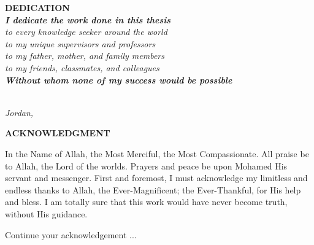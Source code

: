 \documentclass[
11pt, %
oneside, %
english, %
onehalfspacing, %
liststotoc, %
toctotoc, %
parskip, %
]{MastersDoctoralThesis} %
\begin{document}
\cleardoublepage
\frontmatter
{} %
\cleardoublepage{}
\begin{center}
{\Large \bfseries DEDICATION}\\[3cm]
\Large{\textit{\textbf{I dedicate the work done in this thesis}}}\\[2cm]
\Large{\textit{to every knowledge seeker around the world}}\\[1cm]
\Large{\textit{to my unique supervisors and professors}}\\[1cm]
\Large{\textit{to my father, mother, and family members}}\\[1cm]
\Large{\textit{to my friends, classmates, and colleagues}}\\[2cm]
\Large{\textit{\textbf{Without whom none of my success would be possible}}}\\[5cm]
\begin{flushright}
\textit{\authorname}\\
\textit{Jordan, \the\year}
\end{flushright} 
\end{center}
\cleardoublepage{}
\begin{center}
{\Large \bfseries ACKNOWLEDGMENT}\\[2cm]
\end{center}
{\large
In the Name of Allah, the Most Merciful, the Most Compassionate. All praise be to Allah, the Lord of the worlds. Prayers and peace be upon Mohamed His servant and messenger. First and foremost, I must acknowledge my limitless and endless thanks to Allah, the Ever-Magnificent; the Ever-Thankful, for His help and bless. I am totally sure that this work would have never become truth, without His guidance.

Continue your acknowledgement ...
}
\tableofcontents %
\end{document}
